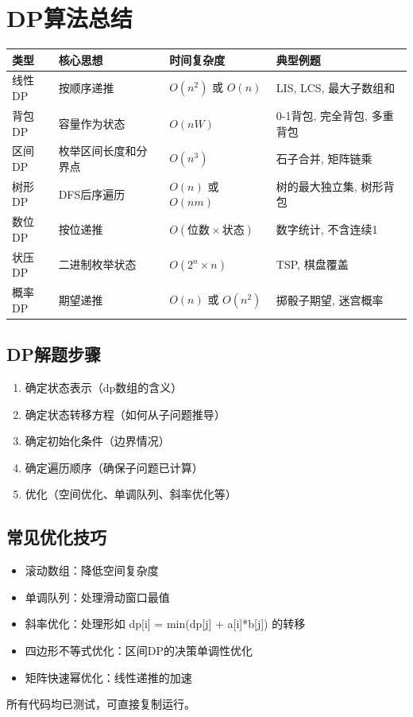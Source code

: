 \documentclass[12pt,a4paper]{ctexart}
\begin{document}
	\section{DP算法总结}
	\begin{table}[h]
		\centering
		\begin{tabularx}{\textwidth}{|l|p{4cm}|l|X|}
			\hline
			类型 & 核心思想 & 时间复杂度 & 典型例题 \\
			\hline
			线性DP & 按顺序递推 & $O(n^2)$ 或 $O(n)$ & LIS, LCS, 最大子数组和 \\
			\hline
			背包DP & 容量作为状态 & $O(nW)$ & 0-1背包, 完全背包, 多重背包 \\
			\hline
			区间DP & 枚举区间长度和分界点 & $O(n^3)$ & 石子合并, 矩阵链乘 \\
			\hline
			树形DP & DFS后序遍历 & $O(n)$ 或 $O(nm)$ & 树的最大独立集, 树形背包 \\
			\hline
			数位DP & 按位递推 & $O(位数 \times 状态)$ & 数字统计, 不含连续1 \\
			\hline
			状压DP & 二进制枚举状态 & $O(2^n \times n)$ & TSP, 棋盘覆盖 \\
			\hline
			概率DP & 期望递推 & $O(n)$ 或 $O(n^2)$ & 掷骰子期望, 迷宫概率 \\
			\hline
		\end{tabularx}
	\end{table}
	\subsection*{DP解题步骤}
	\begin{enumerate}
		\item 确定状态表示（dp数组的含义）
		\item 确定状态转移方程（如何从子问题推导）
		\item 确定初始化条件（边界情况）
		\item 确定遍历顺序（确保子问题已计算）
		\item 优化（空间优化、单调队列、斜率优化等）
	\end{enumerate}
	\subsection*{常见优化技巧}
	\begin{itemize}
		\item 滚动数组：降低空间复杂度
		\item 单调队列：处理滑动窗口最值
		\item 斜率优化：处理形如 dp[i] = min(dp[j] + a[i]*b[j]) 的转移
		\item 四边形不等式优化：区间DP的决策单调性优化
		\item 矩阵快速幂优化：线性递推的加速
	\end{itemize}
	\vspace{1cm}
	\begin{center}
		\textcolor{mid}{所有代码均已测试，可直接复制运行。}
	\end{center}
\end{document}
